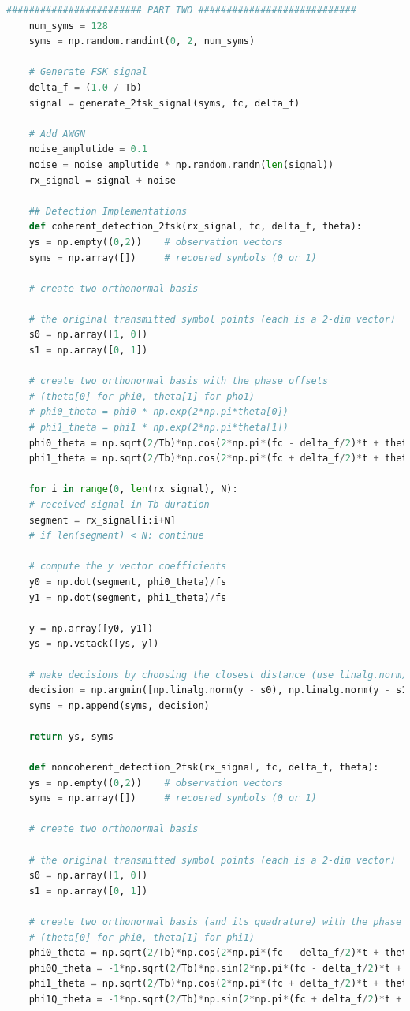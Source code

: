 \documentclass[
	letterpaper, %
	10pt, %
]{CSUniSchoolLabReport}
\begin{document}
\begin{lstlisting}[language=Python]
	######################## PART TWO ############################
	num_syms = 128
	syms = np.random.randint(0, 2, num_syms)
	
	# Generate FSK signal
	delta_f = (1.0 / Tb)
	signal = generate_2fsk_signal(syms, fc, delta_f)
	
	# Add AWGN
	noise_amplutide = 0.1
	noise = noise_amplutide * np.random.randn(len(signal))
	rx_signal = signal + noise
	
	## Detection Implementations
	def coherent_detection_2fsk(rx_signal, fc, delta_f, theta):
	ys = np.empty((0,2))    # observation vectors
	syms = np.array([])     # recoered symbols (0 or 1)
	
	# create two orthonormal basis
	
	# the original transmitted symbol points (each is a 2-dim vector)
	s0 = np.array([1, 0])
	s1 = np.array([0, 1])
	
	# create two orthonormal basis with the phase offsets 
	# (theta[0] for phi0, theta[1] for pho1)
	# phi0_theta = phi0 * np.exp(2*np.pi*theta[0])
	# phi1_theta = phi1 * np.exp(2*np.pi*theta[1])
	phi0_theta = np.sqrt(2/Tb)*np.cos(2*np.pi*(fc - delta_f/2)*t + theta[0])
	phi1_theta = np.sqrt(2/Tb)*np.cos(2*np.pi*(fc + delta_f/2)*t + theta[1])
	
	for i in range(0, len(rx_signal), N):
	# received signal in Tb duration
	segment = rx_signal[i:i+N]
	# if len(segment) < N: continue
	
	# compute the y vector coefficients
	y0 = np.dot(segment, phi0_theta)/fs
	y1 = np.dot(segment, phi1_theta)/fs
	
	y = np.array([y0, y1])
	ys = np.vstack([ys, y])
	
	# make decisions by choosing the closest distance (use linalg.norm)
	decision = np.argmin([np.linalg.norm(y - s0), np.linalg.norm(y - s1)])
	syms = np.append(syms, decision)
	
	return ys, syms
	
	def noncoherent_detection_2fsk(rx_signal, fc, delta_f, theta):
	ys = np.empty((0,2))    # observation vectors
	syms = np.array([])     # recoered symbols (0 or 1)
	
	# create two orthonormal basis
	
	# the original transmitted symbol points (each is a 2-dim vector)
	s0 = np.array([1, 0])
	s1 = np.array([0, 1])
	
	# create two orthonormal basis (and its quadrature) with the phase offsets
	# (theta[0] for phi0, theta[1] for phi1)
	phi0_theta = np.sqrt(2/Tb)*np.cos(2*np.pi*(fc - delta_f/2)*t + theta[0])
	phi0Q_theta = -1*np.sqrt(2/Tb)*np.sin(2*np.pi*(fc - delta_f/2)*t + theta[0])
	phi1_theta = np.sqrt(2/Tb)*np.cos(2*np.pi*(fc + delta_f/2)*t + theta[1])
	phi1Q_theta = -1*np.sqrt(2/Tb)*np.sin(2*np.pi*(fc + delta_f/2)*t + theta[1])
	

\end{lstlisting}
\end{document}
